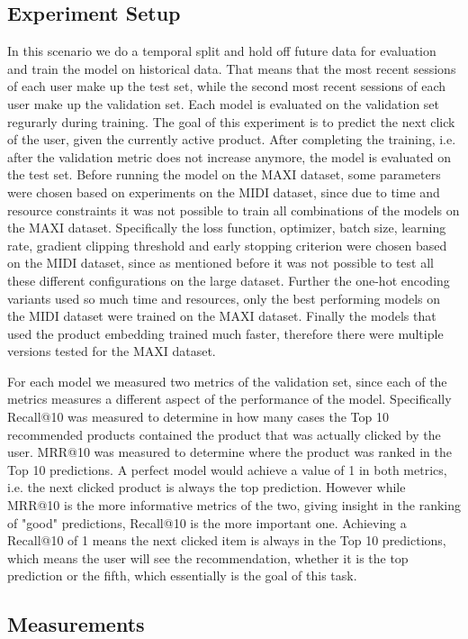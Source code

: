 \subsection{Experiment Setup}\label{sec:exp_setup}
In this scenario we do a temporal split and hold off future data for evaluation and train the model on historical data.
That means that the most recent sessions of each user make up the test set, while the second most recent sessions of each user make up the validation set.
Each model is evaluated on the validation set regurarly during training.
The goal of this experiment is to predict the next click of the user, given the currently active product.
After completing the training, i.e. after the validation metric does not increase anymore, the model is evaluated on the test set.
Before running the model on the MAXI dataset, some parameters were chosen based on experiments on the MIDI dataset, since due to time and resource constraints it was not possible to train all combinations of the models on the MAXI dataset.
Specifically the loss function, optimizer, batch size, learning rate, gradient clipping threshold and early stopping criterion were chosen based on the MIDI dataset, since as mentioned before it was not possible to test all these different configurations on the large dataset.
Further the one-hot encoding variants used so much time and resources, only the best performing models on the MIDI dataset were trained on the MAXI dataset.
Finally the models that used the product embedding trained much faster, therefore there were multiple versions tested for the MAXI dataset.
\par
For each model we measured two metrics of the validation set, since each of the metrics measures a different aspect of the performance of the model.
Specifically Recall@10 was measured to determine in how many cases the Top 10
 recommended products contained the product that was actually clicked by the user.
MRR@10 was measured to determine where the product was ranked in the Top 10 predictions.
A perfect model would achieve a value of 1 in both metrics, i.e. the next clicked product is always the top prediction.
However while MRR@10 is the more informative metrics of the two, giving insight in the ranking of "good" predictions, Recall@10 is the more important one.
Achieving a Recall@10 of 1 means the next clicked item is always in the Top 10 predictions, which means the user will see the recommendation, whether it is the top prediction or the fifth, which essentially is the goal of this task.
\subsection{Measurements}

